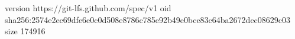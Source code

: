version https://git-lfs.github.com/spec/v1
oid sha256:2574e2ec69dfe6e0c0d508e8786c785e92b49e0bce83c64ba2672dec08629c03
size 174916
